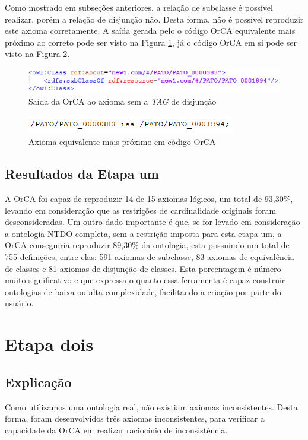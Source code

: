 \documentclass{bcc}
\begin{document}
Como mostrado em subseções anteriores, a relação de subclasse é possível realizar, porém a relação de disjunção não. Desta forma, não é possível reproduzir este axioma corretamente. A saída gerada pelo o código OrCA equivalente mais próximo ao correto pode ser visto na Figura \ref{fig:axiomae_orca}, já o código OrCA em si pode ser visto na Figura \ref{fig:axiomae_orca_sintaxe}.
 
\begin{figure}[H]
\centering
\includegraphics[width=.8\textwidth]{Figuras/axiomae_orca.png}
\caption{Saída da OrCA ao axioma sem a \textit{TAG} de disjunção} 
\label{fig:axiomae_orca}
\end{figure}


\begin{figure}[H]
\centering
\includegraphics[width=.5\textwidth]{Figuras/axiomae_orca_sintaxe.png}
\caption{Axioma equivalente mais próximo em código OrCA} 
\label{fig:axiomae_orca_sintaxe}
\end{figure}

\subsection{Resultados da Etapa um}

A OrCA foi capaz de reproduzir 14 de 15 axiomas lógicos, um total de 93,30\%, levando em consideração que as restrições de cardinalidade originais foram desconsideradas. Um outro dado importante é que, se for levado em consideração a ontologia NTDO completa, sem a restrição imposta para esta etapa um, a OrCA conseguiria reproduzir 89,30\% da ontologia, esta possuindo um total de 755 definições, entre elas: 591 axiomas de subclasse, 83 axiomas de equivalência de classes e 81 axiomas de disjunção de classes. Esta porcentagem é número muito significativo e que expressa o quanto essa ferramenta é capaz construir ontologias de baixa ou alta complexidade, facilitando a criação por parte do usuário.

\section{Etapa dois}
\subsection{Explicação}
Como utilizamos uma ontologia real, não existiam axiomas inconsistentes. Desta forma, foram desenvolvidos três axiomas inconsistentes, para verificar a capacidade da OrCA em realizar raciocínio de inconsistência. 
\end{document}
